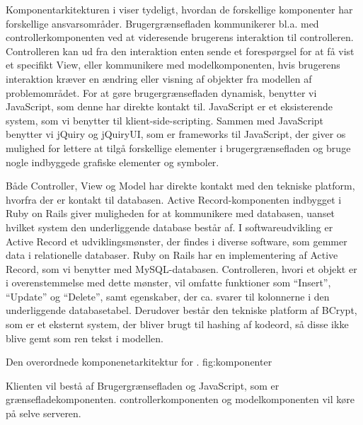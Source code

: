 Komponentarkitekturen i  viser tydeligt, hvordan de forskellige komponenter har forskellige ansvarsområder. Brugergrænsefladen kommunikerer bl.a. med controllerkomponenten ved at videresende brugerens interaktion til controlleren. Controlleren kan ud fra den interaktion enten sende et forespørgsel for at få vist et specifikt View, eller kommunikere med modelkomponenten, hvis brugerens interaktion kræver en ændring eller visning af objekter fra modellen af problemområdet. For at gøre brugergrænsefladen dynamisk, benytter vi JavaScript, som denne har direkte kontakt til. JavaScript er et eksisterende system, som vi benytter til klient-side-scripting. Sammen med JavaScript benytter vi jQuiry og jQuiryUI, som er frameworks til JavaScript, der giver os mulighed for lettere at tilgå forskellige elementer i brugergrænsefladen og bruge nogle indbyggede grafiske elementer og symboler.


Både Controller, View og Model har direkte kontakt med den tekniske platform, hvorfra der er kontakt til databasen. Active Record-komponenten indbygget i Ruby on Rails giver muligheden for at kommunikere med databasen, uanset hvilket system den underliggende database består af. I softwareudvikling er Active Record et udviklingsmønster, der findes i diverse software, som gemmer data i relationelle databaser. Ruby on Rails har en implementering af Active Record, som vi benytter med MySQL-databasen. Controlleren, hvori et objekt er i overenstemmelse med dette mønster, vil omfatte funktioner som ``Insert'', ``Update'' og ``Delete'', samt egenskaber, der ca. svarer til kolonnerne i den underliggende databasetabel.\cite{activerecordwiki} Derudover består den tekniske platform af BCrypt, som er et eksternt system, der bliver brugt til hashing af kodeord, så disse ikke blive gemt som ren tekst i modellen.


	{Den overordnede komponenetarkitektur for \Foodl{}.}
	{fig:komponenter}


Klienten vil bestå af Brugergrænsefladen og JavaScript, som er grænsefladekomponenten. controllerkomponenten og modelkomponenten vil køre på selve serveren.